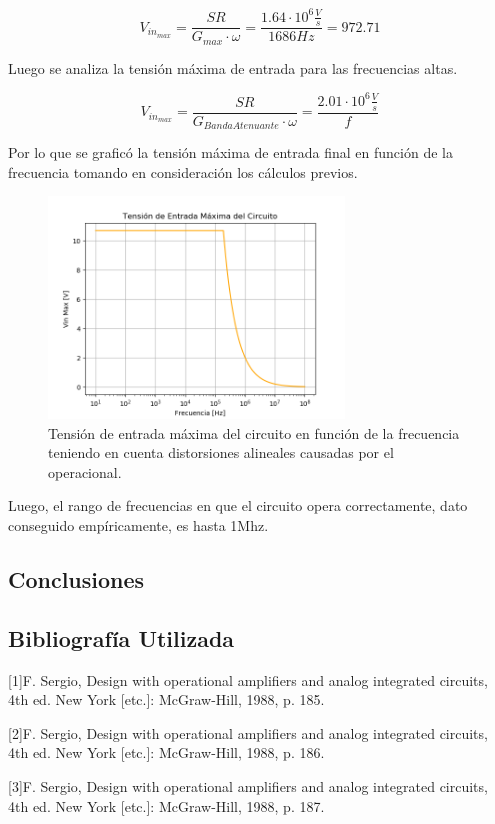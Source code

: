 \begin{equation}
	V_{in_{max}} = \frac{SR}{G_{max}\cdot \omega} = \frac{1.64\cdot 10^6\frac{V}{s}}{1686Hz} = 972.71
\end{equation}

Luego se analiza la tensión máxima de entrada para las frecuencias altas.

\begin{equation}
	V_{in_{max}} = \frac{SR}{G_{Banda Atenuante}\cdot \omega} = \frac{2.01\cdot 10^6\frac{V}{s}}{f}
\end{equation}

Por lo que se graficó la tensión máxima de entrada final en función de la frecuencia tomando en consideración los cálculos previos.

\begin{figure} [H]
	\centering
	\includegraphics[width=0.7\textwidth]{Imagenes/vin_max.PNG}
	\caption{Tensión de entrada máxima del circuito en función de la frecuencia teniendo en cuenta distorsiones alineales causadas por el operacional.}
	\label{fig:vin_max}
\end{figure}

Luego, el rango de frecuencias en que el circuito opera correctamente, dato conseguido empíricamente, es hasta 1Mhz.


\subsection{Conclusiones}

\subsection{Bibliografía Utilizada}
[1]F. Sergio, Design with operational amplifiers and analog integrated circuits, 4th ed. New York [etc.]: McGraw-Hill, 1988, p. 185.

[2]F. Sergio, Design with operational amplifiers and analog integrated circuits, 4th ed. New York [etc.]: McGraw-Hill, 1988, p. 186.

[3]F. Sergio, Design with operational amplifiers and analog integrated circuits, 4th ed. New York [etc.]: McGraw-Hill, 1988, p. 187.


